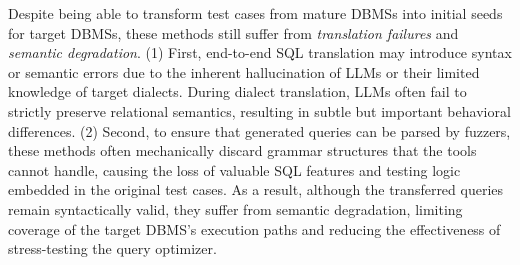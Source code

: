 \documentclass[sigconf,review,anonymous]{acmart}
\begin{document}

Despite being able to transform test cases from mature DBMSs into initial seeds for target DBMSs, these methods still suffer from \textit{translation failures} and \textit{semantic degradation}.
(1) First, end-to-end SQL translation may introduce syntax or semantic errors due to the inherent hallucination of LLMs or their limited knowledge of target dialects. During dialect translation, LLMs often fail to strictly preserve relational semantics, resulting in subtle but important behavioral differences. 
(2) Second, to ensure that generated queries can be parsed by fuzzers, these methods often mechanically discard grammar structures that the tools cannot handle, causing the loss of valuable SQL features and testing logic embedded in the original test cases. As a result, although the transferred queries remain syntactically valid, they suffer from semantic degradation, limiting coverage of the target DBMS’s execution paths and reducing the effectiveness of stress-testing the query optimizer.

\end{document}
